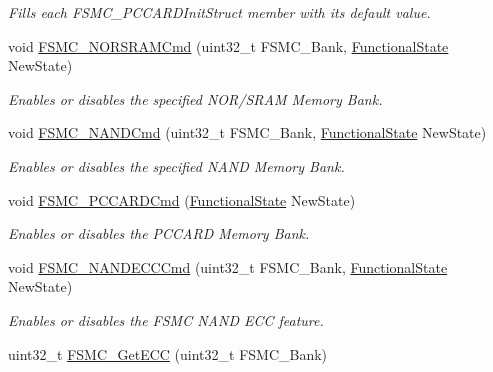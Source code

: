 \begin{DoxyCompactItemize}
\begin{DoxyCompactList}\small\item\em Fills each F\+S\+M\+C\+\_\+\+P\+C\+C\+A\+R\+D\+Init\+Struct member with its default value. \end{DoxyCompactList}\item 
void \mbox{\hyperlink{group___f_s_m_c___exported___functions_gaf943f0f2680168d3a95a3c2c9f3eca2a}{F\+S\+M\+C\+\_\+\+N\+O\+R\+S\+R\+A\+M\+Cmd}} (uint32\+\_\+t F\+S\+M\+C\+\_\+\+Bank, \mbox{\hyperlink{group___exported__types_gac9a7e9a35d2513ec15c3b537aaa4fba1}{Functional\+State}} New\+State)
\begin{DoxyCompactList}\small\item\em Enables or disables the specified N\+O\+R/\+S\+R\+AM Memory Bank. \end{DoxyCompactList}\item 
void \mbox{\hyperlink{group___f_s_m_c___exported___functions_ga33ec7c39ea4d42e92c72c6e517d8235c}{F\+S\+M\+C\+\_\+\+N\+A\+N\+D\+Cmd}} (uint32\+\_\+t F\+S\+M\+C\+\_\+\+Bank, \mbox{\hyperlink{group___exported__types_gac9a7e9a35d2513ec15c3b537aaa4fba1}{Functional\+State}} New\+State)
\begin{DoxyCompactList}\small\item\em Enables or disables the specified N\+A\+ND Memory Bank. \end{DoxyCompactList}\item 
void \mbox{\hyperlink{group___f_s_m_c___exported___functions_ga2d410151ceb3428c6a1bf374a0472cde}{F\+S\+M\+C\+\_\+\+P\+C\+C\+A\+R\+D\+Cmd}} (\mbox{\hyperlink{group___exported__types_gac9a7e9a35d2513ec15c3b537aaa4fba1}{Functional\+State}} New\+State)
\begin{DoxyCompactList}\small\item\em Enables or disables the P\+C\+C\+A\+RD Memory Bank. \end{DoxyCompactList}\item 
void \mbox{\hyperlink{group___f_s_m_c___exported___functions_ga5800301fc39bbe998a18ebd9ff191cdc}{F\+S\+M\+C\+\_\+\+N\+A\+N\+D\+E\+C\+C\+Cmd}} (uint32\+\_\+t F\+S\+M\+C\+\_\+\+Bank, \mbox{\hyperlink{group___exported__types_gac9a7e9a35d2513ec15c3b537aaa4fba1}{Functional\+State}} New\+State)
\begin{DoxyCompactList}\small\item\em Enables or disables the F\+S\+MC N\+A\+ND E\+CC feature. \end{DoxyCompactList}\item 
uint32\+\_\+t \mbox{\hyperlink{group___f_s_m_c___exported___functions_gaad6d4f5b5a41684ce053fea55bdb98d8}{F\+S\+M\+C\+\_\+\+Get\+E\+CC}} (uint32\+\_\+t F\+S\+M\+C\+\_\+\+Bank)

\end{DoxyCompactItemize}
